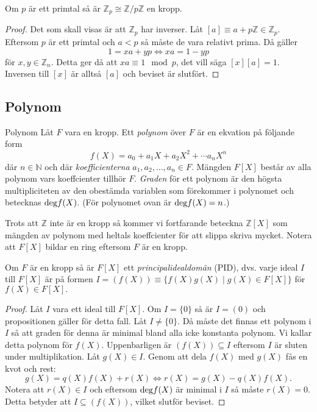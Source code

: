 \documentclass{article}
\newcommand{\grad}[0]{\textnormal{deg}}
\theoremstyle{definition}
\begin{document}
\begin{mytheo}{}{}
  Om $p$ är ett primtal så är $\mathbb{Z}_p \cong \mathbb{Z}/p\mathbb{Z}$ en kropp.
\end{mytheo}

\begin{proof}
  Det som skall visas är att $\mathbb{Z}_p$ har inverser. Låt $[a] \equiv a + p \mathbb{Z} \in \mathbb{Z}_p$. Eftersom $p$ är ett primtal och 
  $a < p$ så måste de vara relativt prima. Då gäller 
  \[ 1 = xa + yp  \iff xa = 1 - yp\]
  för $x, y \in \mathbb{Z}_n$. Detta ger då att $xa \equiv 1 \mod p$, det vill säga $[x][a] = 1$. Inversen till 
  $[x]$ är alltså $[a]$ och beviset är slutfört. 
\end{proof}


\subsection{Polynom}
\begin{mydef}{Polynom}{}
  Låt $F$ vara en kropp. Ett \textit{polynom} över $F$ är en ekvation på följande form
  \[f(X) = a_0 + a_1X + a_2X^2 + \cdots a_nX^n\]
  där $n \in \mathbb{N}$ och där \textit{koefficienterna} $a_1, a_2, \ldots, a_n \in F$. 
  Mängden $F[X]$ består av alla polynom vars koeffcienter tillhör $F$. \textit{Graden} för ett polynom är den högsta multipliciteten av den obestämda variablen som 
  förekommer i polynomet och betecknas $\grad f(X)$. (För polynomet ovan är $\grad f(X) = n$.)
\end{mydef}
Trots att $\mathbb{Z}$ inte är en kropp så kommer vi fortfarande beteckna $\mathbb{Z}[X]$ som mängden av polynom med heltals koeffcienter
för att slippa skriva mycket. Notera att $F[X]$ bildar en ring eftersom $F$ är en kropp.

\hypertarget{pid}{}
\begin{myprop}{}{}
  Om $F$ är en kropp så är $F[X]$ ett \textit{principalidealdomän} (PID), dvs. varje ideal $I$ till $F[X]$ är på formen 
  $I = (f(X)) \equiv \{f(X)g(X) \; | \; g(X) \in F[X]\}$ för $f(X) \in F[X].$
\end{myprop}
\begin{proof}
  Låt $I$ vara ett ideal till $F[X]$. Om $I = \{0\}$ så är $I = (0)$ och propositionen gäller för detta fall. Låt $I \neq \{0\}$.
  Då måste det finnas ett polynom i $I$ så att graden för denna är minimal bland alla icke konstanta polynom. Vi kallar detta polynom 
  för $f(X).$ Uppenbarligen är $(f(X)) \subseteq I$ eftersom $I$ är sluten under multiplikation. Låt $g(X) \in I$. 
  Genom att dela $f(X)$ med $g(X)$ fås en kvot och rest: 
  \[g(X) = q(X)f(X) + r(X) \iff r(X) = g(X) - q(X)f(X).\]
  Notera att $r(X) \in I$ och eftersom $\grad f(X)$ är minimal i $I$ så måste $r(X) = 0.$ Detta betyder att $I \subseteq (f(X))$, vilket 
  slutför beviset.
\end{proof}
\end{document}
